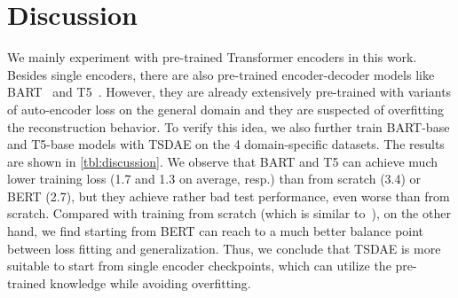 \documentclass[11pt]{article}
\begin{document}
\begin{table}[t]
\centering
{}
\caption{Test performance/training loss of TSDAE models starting from different checkpoints. The results for BERT-base are copied from \autoref{tbl:main_results}.}
\label{tbl:discussion}
\end{table}

\section{Discussion}
We mainly experiment with pre-trained Transformer encoders in this work. Besides single encoders, there are also pre-trained encoder-decoder models like BART~\cite{lewis-etal-2020-bart} and T5~\cite{DBLP:journals/jmlr/RaffelSRLNMZLL20}. However, they are already extensively pre-trained with variants of auto-encoder loss on the general domain and they are suspected of overfitting the reconstruction behavior. To verify this idea, we also further train BART-base and T5-base models with TSDAE on the 4 domain-specific datasets. The results are shown in \autoref{tbl:discussion}. We observe that BART and T5 can achieve much lower training loss (1.7 and 1.3 on average, resp.) than from scratch (3.4) or BERT (2.7), but they achieve rather bad test performance, even worse than from scratch. Compared with training from scratch (which is similar to~\citet{DBLP:conf/emnlp/ZhangWLL18}), on the other hand, we find starting from BERT can reach to a much better balance point between loss fitting and generalization. Thus, we conclude that TSDAE is more suitable to start from single encoder checkpoints, which can utilize the pre-trained knowledge while avoiding overfitting. 
\end{document}
